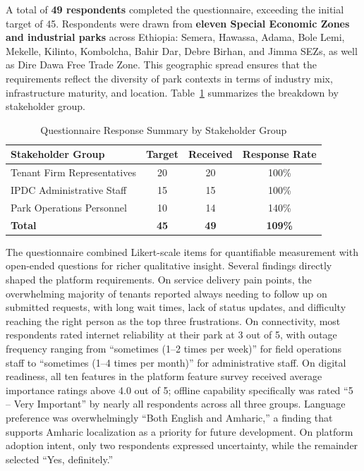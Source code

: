 A total of \textbf{49 respondents} completed the questionnaire, exceeding the initial target of 45. Respondents were drawn from \textbf{eleven Special Economic Zones and industrial parks} across Ethiopia: Semera, Hawassa, Adama, Bole Lemi, Mekelle, Kilinto, Kombolcha, Bahir Dar, Debre Birhan, and Jimma SEZs, as well as Dire Dawa Free Trade Zone. This geographic spread ensures that the requirements reflect the diversity of park contexts in terms of industry mix, infrastructure maturity, and location. Table~\ref{tab:survey-respondents} summarizes the breakdown by stakeholder group.

\begin{table}[H]
\centering
\caption{Questionnaire Response Summary by Stakeholder Group}
\label{tab:survey-respondents}
\small
\begin{tabular}{lccc}
\toprule
\textbf{Stakeholder Group} & \textbf{Target} & \textbf{Received} & \textbf{Response Rate} \\
\midrule
Tenant Firm Representatives & 20 & 20 & 100\% \\
IPDC Administrative Staff   & 15 & 15 & 100\% \\
Park Operations Personnel   & 10 & 14 & 140\% \\
\midrule
\textbf{Total} & \textbf{45} & \textbf{49} & \textbf{109\%} \\
\bottomrule
\end{tabular}
\end{table}

The questionnaire combined Likert-scale items for quantifiable measurement with open-ended questions for richer qualitative insight. Several findings directly shaped the platform requirements. On service delivery pain points, the overwhelming majority of tenants reported always needing to follow up on submitted requests, with long wait times, lack of status updates, and difficulty reaching the right person as the top three frustrations. On connectivity, most respondents rated internet reliability at their park at 3 out of 5, with outage frequency ranging from ``sometimes (1--2 times per week)'' for field operations staff to ``sometimes (1--4 times per month)'' for administrative staff. On digital readiness, all ten features in the platform feature survey received average importance ratings above 4.0 out of 5; offline capability specifically was rated ``5 -- Very Important'' by nearly all respondents across all three groups. Language preference was overwhelmingly ``Both English and Amharic,'' a finding that supports Amharic localization as a priority for future development. On platform adoption intent, only two respondents expressed uncertainty, while the remainder selected ``Yes, definitely.''

